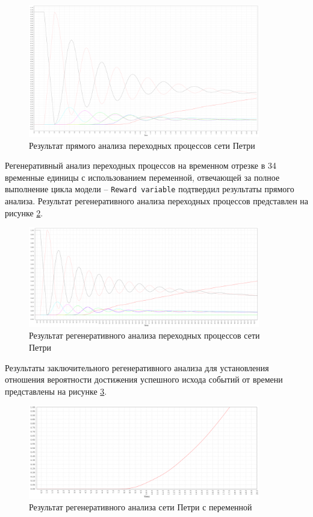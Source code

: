 \begin{figure}[h!btp]
	\centering
	\includegraphics[width=0.9\textwidth]{../inc/forward_transient.png}
	\caption{Результат прямого анализа переходных процессов сети Петри}
	\label{fig:ft}
\end{figure}

Регенеративный анализ переходных процессов\cite{regenerative-transient} на временном отрезке в 34 временные единицы с использованием переменной, отвечающей за полное выполнение цикла модели -- \texttt{Reward variable}\cite{reward} подтвердил результаты прямого анализа. Результат регенеративного анализа переходных процессов представлен на рисунке \ref{fig:rt}.

\begin{figure}[h!btp]
	\centering
	\includegraphics[width=0.9\textwidth]{../inc/timed_reward.png}
	\caption{Результат регенеративного анализа переходных процессов сети Петри}
	\label{fig:rt}
\end{figure}

\clearpage

Результаты заключительного регенеративного анализа для установления отношения вероятности достижения успешного исхода событий от времени представлены на рисунке \ref{fig:sp}.

\begin{figure}[h!btp]
	\centering
	\includegraphics[width=0.9\textwidth]{../inc/stud_prob.png}
	\caption{Результат регенеративного анализа сети Петри с переменной}
	\label{fig:sp}
\end{figure}

